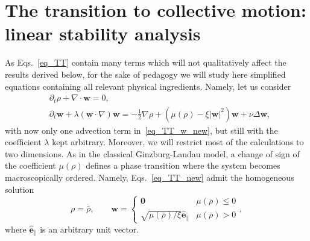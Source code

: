 \section{The transition to collective motion: linear stability analysis}

As Eqs.~\eqref{eq_TT} contain many terms which will not qualitatively affect the results derived below, 
for the sake of pedagogy we will study here simplified equations containing all relevant physical ingredients.
Namely, let us consider
\begin{subequations}
\label{eq_TT_new}
\begin{align}
\label{eq_TT_rho_new}
& \partial_t \rho + \nabla \cdot \bm w = 0 , \\
\label{eq_TT_w_new}
& \partial_t \bm w + \lambda (\bm w \cdot \nabla)\bm w = 
-\frac{1}{2}\nabla \rho + \left( \mu(\rho) - \xi |\bm w|^2 \right) \bm w + \nu \Delta \bm w ,
\end{align}
\end{subequations}
with now only one advection term in~\eqref{eq_TT_w_new}, but still with the coefficient $\lambda$ kept arbitrary.
Moreover, we will restrict most of the calculations to two dimensions.
As in the classical Ginzburg-Landau model, a change of sign of the coefficient $\mu(\rho)$ defines a phase transition where the system becomes macroscopically ordered.
Namely, Eqs.~\eqref{eq_TT_new} admit the homogeneous solution
\begin{equation} \label{eq_hos}
\rho = \bar{\rho}, \qquad \bm w = \begin{cases}
    \bm 0 & \mu(\bar\rho) \le 0 \\
    \sqrt{\mu(\bar{\rho})/\xi} \hat{\bm e}_\| & \mu(\bar\rho) > 0
\end{cases} ,
\end{equation}
where $\hat{\bm e}_\|$ is an arbitrary unit vector.

